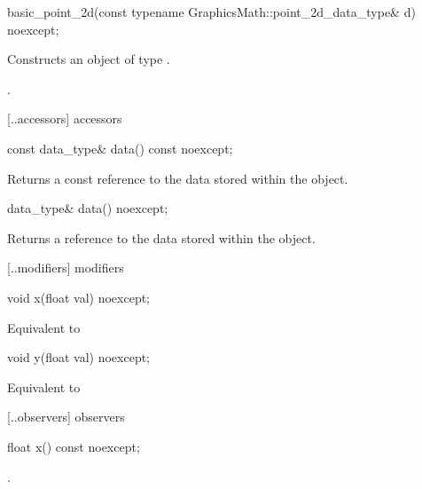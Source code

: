 %
\begin{itemdecl}
basic_point_2d(const typename GraphicsMath::point_2d_data_type& d) noexcept;
\end{itemdecl}
\begin{itemdescr}
\pnum
\effects
Constructs an object of type .

\pnum
\postconditions
{}.
\end{itemdescr}

 [\iotwod.\pointtwod.accessors]{ accessors}

%
\begin{itemdecl}
const data_type& data() const noexcept;
\end{itemdecl}
\begin{itemdescr}
\pnum
\returns
Returns a const reference to the data stored within the  object.
\end{itemdescr}

\begin{itemdecl}
data_type& data() noexcept;
\end{itemdecl}
\begin{itemdescr}
\pnum
\returns
Returns a reference to the data stored within the  object.
\end{itemdescr}

 [\iotwod.\pointtwod.modifiers]{ modifiers}

%
\begin{itemdecl}
void x(float val) noexcept;
\end{itemdecl}
\begin{itemdescr}
\pnum
\effects
Equivalent to 
\end{itemdescr}

%
\begin{itemdecl}
void y(float val) noexcept;
\end{itemdecl}
\begin{itemdescr}
\pnum
\effects
Equivalent to 
\end{itemdescr}

 [\iotwod.\pointtwod.observers]{ observers}

%
\begin{itemdecl}
float x() const noexcept;
\end{itemdecl}
\begin{itemdescr}
\pnum \returns {}.
\end{itemdescr}


